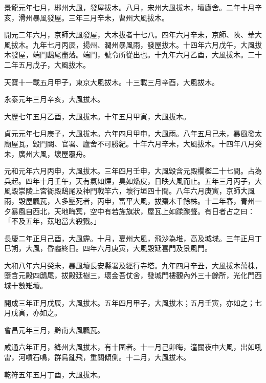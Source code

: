 \begin{pinyinscope}
 景龍元年七月，郴州大風，發屋拔木。八月，宋州大風拔木，壞廬舍。二年十月辛亥，滑州暴風發屋。三年三月辛未，曹州大風拔木。



 開元二年六月，京師大風發屋，大木拔者十七八。四年六月辛未，京師、陜、華大風拔木。九年七月丙辰，揚州、潤州暴風雨，發屋拔木。十四年六月戊午，大風拔木發屋，端門鴟尾盡落。端門，號令所從出也。十九年六月乙酉，大風拔木。二十二年五月戊子，大風拔木。



 天寶十一載五月甲子，東京大風拔木。十三載三月辛酉，大風拔木。



 永泰元年三月辛亥，大風拔木。



 大歷七年五月乙酉，大風拔木。十年五月甲寅，大風拔木。



 貞元元年七月庚子，大風拔木。六年四月甲申，大風雨。八年五月己未，暴風發太廟屋瓦，毀門闕、官署、廬舍不可勝紀。十年六月辛未，大風拔木。十四年八月癸未，廣州大風，壞屋覆舟。



 元和元年六月丙申，大風拔木。三年四月壬申，大風毀含元殿欄檻二十七間。占為兵起。四年十月壬午，天有氣如煙，臭如燔皮，日昳大風而止。五年三月丙子，大風毀崇陵上宮衙殿鴟尾及神門戟竿六，壞行垣四十間。八年六月庚寅，京師大風雨，毀屋飄瓦，人多壓死者，丙申，富平大風，拔棗木千餘株。十二年春，青州一夕暴風自西北，天地晦冥，空中有若旌旗狀，屋瓦上如蹂躒聲。有日者占之曰：「不及五年，茲地當大殺戮。」



 長慶二年正月己酉，大風霾。十月，夏州大風，飛沙為堆，高及城堞。三年正月丁巳朔，大風，昏霾終日。四年六月庚寅，大風毀延喜門及景風門。



 大和八年六月癸未，暴風壞長安縣署及經行寺塔。九年四月辛丑，大風拔木萬株，墮含元殿四鴟尾，拔殿廷樹三，壞金吾仗舍，發城門樓觀內外三十餘所，光化門西城十數雉壞。



 開成三年正月戊辰，大風拔木。五年四月甲子，大風拔木；五月壬寅，亦如之；七月戊寅，亦如之。



 會昌元年三月，黔南大風飄瓦。



 咸通六年正月，絳州大風拔木，有十圍者。十一月己卯晦，潼關夜中大風，出如吼雷，河噴石鳴，群烏亂飛，重關傾側。十二月，大風拔木。



 乾符五年五月丁酉，大風拔木。




\end{pinyinscope}
